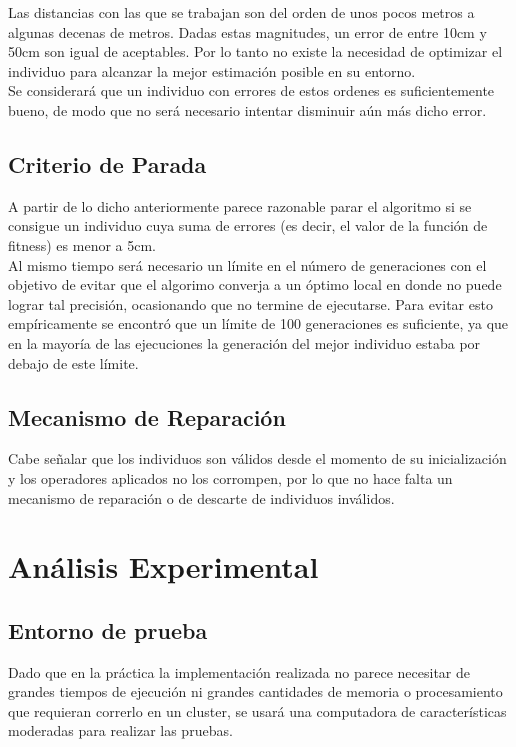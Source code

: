 \documentclass[journal]{IEEEtran}
\begin{document}
Las distancias con las que se trabajan son del orden de unos pocos metros a algunas decenas de metros. Dadas estas magnitudes, un error de entre 10cm y 50cm son igual de aceptables. Por lo tanto no existe la necesidad de optimizar el individuo para alcanzar la mejor estimación posible en su entorno.\\

Se considerará que un individuo con errores de estos ordenes es suficientemente bueno, de modo que no será necesario intentar disminuir aún más dicho error.\\

\subsection{Criterio de Parada}

A partir de lo dicho anteriormente parece razonable parar el algoritmo si se consigue un individuo cuya suma de errores (es decir, el valor de la función de fitness) es menor a 5cm.\\

Al mismo tiempo será necesario un límite en el número de generaciones con el objetivo de evitar que el algorimo converja a un óptimo local en donde no puede lograr tal precisión, ocasionando que no termine de ejecutarse. Para evitar esto empíricamente se encontró que un límite de 100 generaciones es suficiente, ya que en la mayoría de las ejecuciones la generación del mejor individuo estaba por debajo de este límite.\\

\subsection{Mecanismo de Reparación}

Cabe señalar que los individuos son válidos desde el momento de su inicialización y los operadores aplicados no los corrompen, por lo que no hace falta un mecanismo de reparación o de descarte de individuos inválidos.

\section{Análisis Experimental}

\subsection{Entorno de prueba}

Dado que en la práctica la implementación realizada no parece necesitar de grandes tiempos de ejecución ni grandes cantidades de memoria o procesamiento que requieran correrlo en un cluster, se usará una computadora de características moderadas para realizar las pruebas.\\
\end{document}
